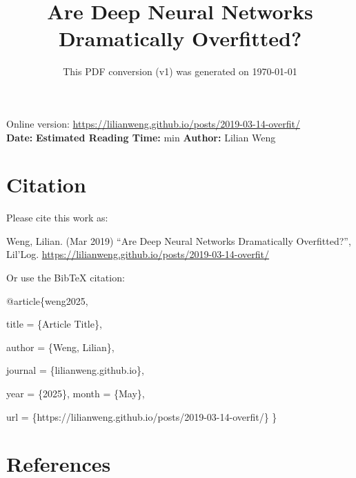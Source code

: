 \documentclass[12pt]{article}
\title{Are Deep Neural Networks Dramatically Overfitted?}
\date{This PDF conversion (v1) was generated on \today\footnotemark}
\begin{document}
\maketitle
\begin{center}
    Online version: \url{https://lilianweng.github.io/posts/2019-03-14-overfit/} \\
    \textbf{Date:} \quad
    \textbf{Estimated Reading Time:}  min \quad
    \textbf{Author:} Lilian Weng
\end{center}




\newpage
\tableofcontents
\newpage
\vspace{1em}
\n\n\n\section{Citation}
Please cite this work as:

\begin{tcolorbox}[colback=black!5!white, colframe=black!80!white, boxrule=0.5pt, arc=2mm, left=1mm, right=1mm, top=1mm, bottom=1mm]
  Weng, Lilian. (Mar 2019) ``Are Deep Neural Networks Dramatically Overfitted?'', Lil'Log. \url{https://lilianweng.github.io/posts/2019-03-14-overfit/}
  \end{tcolorbox}

Or use the BibTeX citation:

\begin{tcolorbox}[
    colback=black!5!white,
    colframe=black!80!white,
    boxrule=0.5pt,
    arc=2mm,
    left=1mm,
    right=1mm,
    top=1mm,
    bottom=1mm,
    listing only,
    listing options={
      basicstyle=\ttfamily\footnotesize,
      breaklines=true,
      literate={\{}{{\char`\{}}1 {\}}{{\char`\}}}1
    }
  ]
  @article\{weng2025,

    title   = \{Article Title\},

    author  = \{Weng, Lilian\},

    journal = \{lilianweng.github.io\},

    year    = \{2025\},
    month   = \{May\},

    url     = \{https://lilianweng.github.io/posts/2019-03-14-overfit/\}\n
  \}
  \end{tcolorbox}

\newpage
\section{References}

\n
\end{document}
